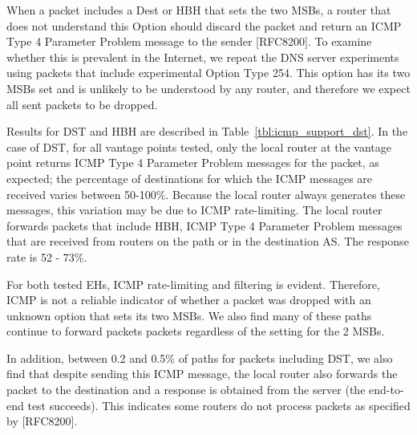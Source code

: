 \documentclass[conference]{IEEEtran}
\begin{document}
When a packet includes a Dest or HBH that sets the two MSBs, a router that does not understand this Option should discard the packet and return an ICMP Type 4 Parameter Problem message to the sender [RFC8200]. To examine whether this is prevalent in the Internet, we repeat the DNS server experiments using packets that include experimental Option Type 254. This option has its two MSBs set and is unlikely to be understood by any router, and therefore we expect all sent packets to be dropped.

Results for DST and HBH are described in Table~\ref{tbl:icmp_support_dst}.
In the case of DST, for all vantage points tested, only the local router at the vantage point returns ICMP Type 4 Parameter Problem messages for the packet, as expected; the percentage of destinations for which the ICMP messages are received varies between 50-100\%. Because the local router always generates these messages, this variation may be due to ICMP rate-limiting. 
The local router forwards packets that include HBH,  ICMP Type 4 Parameter Problem messages that are received from routers on the path or in the destination AS. The response rate is 52 - 73\%. 

For both tested EHs, ICMP rate-limiting and filtering is evident. Therefore, ICMP is not a reliable indicator of whether a packet was dropped with an unknown option that sets its two MSBs. We also find many of these paths continue to forward packets packets regardless of the setting for the 2 MSBs.

In addition, between 0.2 and 0.5\% of paths for packets including DST, we also find that despite sending this ICMP message, the local router also forwards the packet to the destination and a response is  obtained from the server (the end-to-end test succeeds). This indicates some routers do not process packets as specified by [RFC8200].
\end{document}
